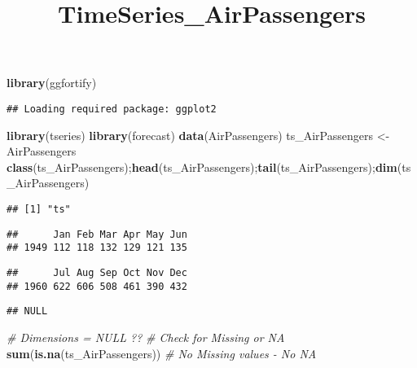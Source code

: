 \documentclass[]{article}
\title{TimeSeries\_AirPassengers}
\author{}
\date{\vspace{-2.5em}}
\newenvironment{Shaded}{\begin{snugshade}}{\end{snugshade}}
\newcommand{\CommentTok}[1]{\textcolor[rgb]{0.56,0.35,0.01}{\textit{#1}}}
\newcommand{\KeywordTok}[1]{\textcolor[rgb]{0.13,0.29,0.53}{\textbf{#1}}}
\newcommand{\NormalTok}[1]{#1}
\newcommand{\StringTok}[1]{\textcolor[rgb]{0.31,0.60,0.02}{#1}}
\begin{document}
\maketitle

\begin{Shaded}
\begin{Highlighting}[]
\KeywordTok{library}\NormalTok{(ggfortify)}
\end{Highlighting}
\end{Shaded}

\begin{verbatim}
## Loading required package: ggplot2
\end{verbatim}

\begin{Shaded}
\begin{Highlighting}[]
\KeywordTok{library}\NormalTok{(tseries)}
\KeywordTok{library}\NormalTok{(forecast)}
\KeywordTok{data}\NormalTok{(AirPassengers)}
\NormalTok{ts_AirPassengers <-}\StringTok{ }\NormalTok{AirPassengers}
\KeywordTok{class}\NormalTok{(ts_AirPassengers);}\KeywordTok{head}\NormalTok{(ts_AirPassengers);}\KeywordTok{tail}\NormalTok{(ts_AirPassengers);}\KeywordTok{dim}\NormalTok{(ts_AirPassengers)}
\end{Highlighting}
\end{Shaded}

\begin{verbatim}
## [1] "ts"
\end{verbatim}

\begin{verbatim}
##      Jan Feb Mar Apr May Jun
## 1949 112 118 132 129 121 135
\end{verbatim}

\begin{verbatim}
##      Jul Aug Sep Oct Nov Dec
## 1960 622 606 508 461 390 432
\end{verbatim}

\begin{verbatim}
## NULL
\end{verbatim}

\begin{Shaded}
\begin{Highlighting}[]
\CommentTok{# Dimensions = NULL ??}
\CommentTok{# Check for Missing or NA }
\KeywordTok{sum}\NormalTok{(}\KeywordTok{is.na}\NormalTok{(ts_AirPassengers)) }\CommentTok{# No Missing values - No NA }
\end{Highlighting}
\end{Shaded}
\end{document}
